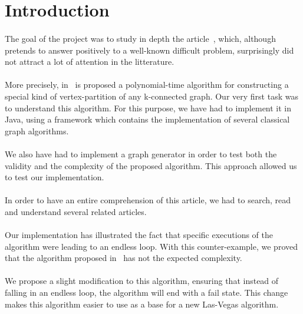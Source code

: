 \section{Introduction}
\paragraph{}
The goal of the project was to study in depth the article~\cite{JS94}, which,
although pretends to answer positively to a well-known difficult problem,
surprisingly did not attract a lot of attention in the litterature.

\paragraph{}
More precisely, in~\cite{JS94} is proposed a polynomial-time algorithm for
constructing a special kind of vertex-partition of any k-connected graph. Our
very first task was to understand this algorithm. For this purpose, we have had
to implement it in Java, using a framework which contains the implementation
of several classical graph algorithms.

\paragraph{}
We also have had to implement a graph generator in order to test both the
validity and the complexity of the proposed algorithm. This approach allowed
us to test our implementation.


\paragraph{}
In order to have an entire comprehension of this article, we had to search,
read and understand several related articles.

\paragraph{}
Our implementation has illustrated the fact that specific executions of the
algorithm were leading to an endless loop. With this counter-example, we
proved that the algorithm proposed in~\cite{JS94} has not the expected
complexity.

\paragraph{}
We propose a slight modification to this algorithm, ensuring that instead of
falling in an endless loop, the algorithm will end with a fail state. This
change makes this algorithm easier to use as a base for a new Las-Vegas
algorithm.
